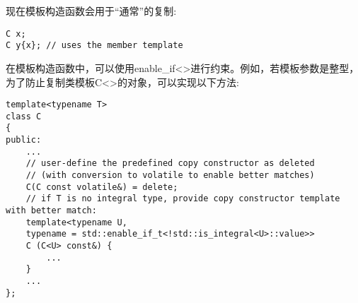 现在模板构造函数会用于“通常”的复制:

\begin{lstlisting}[style=styleCXX]
C x;
C y{x}; // uses the member template
\end{lstlisting}

在模板构造函数中，可以使用enable\_if<>进行约束。例如，若模板参数是整型，为了防止复制类模板C<>的对象，可以实现以下方法:

\begin{lstlisting}[style=styleCXX]
template<typename T>
class C
{
public:
	...
	// user-define the predefined copy constructor as deleted
	// (with conversion to volatile to enable better matches)
	C(C const volatile&) = delete;
	// if T is no integral type, provide copy constructor template with better match:
	template<typename U,
	typename = std::enable_if_t<!std::is_integral<U>::value>>
	C (C<U> const&) {
		...
	}
	...
};
\end{lstlisting}












